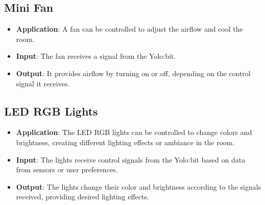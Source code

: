 \subsection{Mini Fan}

\begin{itemize}
    \item \textbf{Application}: A fan can be controlled to adjust the airflow and cool the room.
    \item \textbf{Input}: The fan receives a signal from the Yolo:bit.
    \item \textbf{Output}: It provides airflow by turning on or off, depending on the control signal it receives.
\end{itemize}

\subsection{LED RGB Lights}

\begin{itemize}
    \item \textbf{Application}: The LED RGB lights can be controlled to change colors and brightness, creating different lighting effects or ambiance in the room.
    \item \textbf{Input}: The lights receive control signals from the Yolo:bit based on data from sensors or user preferences.
    \item \textbf{Output}: The lights change their color and brightness according to the signals received, providing desired lighting effects.
\end{itemize}

 

